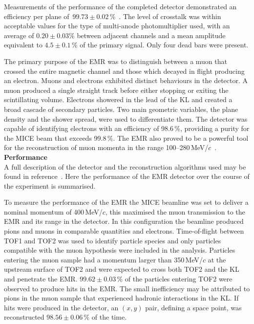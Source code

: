 Measurements of the performance of the completed detector demonstrated
an efficiency per plane
of~$99.73\pm0.02$\,\%~\cite{2016JInst..11T10007,Drielsma:2017doj}.
The level of crosstalk was within acceptable values for the type of
multi-anode photomultiplier used, with an average of $0.20\pm0.03$\%
between adjacent channels and a mean amplitude
equivalent to $4.5\pm0.1$\,\% of the primary signal.
Only four dead bars were present.

The primary purpose of the EMR was to distinguish between a muon that crossed  the entire magnetic channel and those which decayed in flight producing an electron.
Muons and electrons exhibited distinct behaviours in the detector.
A muon produced a single straight track before either stopping or
exiting the scintillating volume.
Electrons showered in the lead of the KL and created a broad cascade
of secondary particles.
Two main geometric variables, the plane density and the shower spread,
were used to differentiate them.
The detector was capable of identifying electrons with an efficiency
of 98.6\,\%, providing a purity for the MICE beam that exceeds
99.8\,\%.
The EMR also proved to be a powerful tool for the reconstruction of
muon momenta in the range
100--280\,MeV/$c$~\cite{2015JInst..10P2012A}.  \\

\noindent\textbf{Performance} \\
\noindent
A full description of the detector and the reconstruction algorithms
used may be found in reference~\cite{2015JInst..10P2012A}.
Here the performance of the EMR detector over the course of the
experiment is summarised.

To measure the performance of the EMR the MICE beamline was set to
deliver a nominal momentum of 400\,MeV/$c$, this maximised the muon
transmission to the EMR and its range in the detector.
In this configuration the beamline produced pions and muons in
comparable quantities and electrons.
Time-of-flight between TOF1 and TOF2 was used to identify particle
species and only particles compatible with the muon hypothesis were
included in the analysis.
Particles entering the muon sample had a momentum larger than
350\,MeV/$c$ at the upstream surface of TOF2 and were expected to
cross both TOF2 and the KL and penetrate the EMR.
$99.62\pm0.03\,\%$ of the particles entering TOF2 were observed to produce
hits in the EMR.
The small inefficiency may be attributed to pions in the muon sample
that experienced hadronic interactions in the KL.
If hits were produced in the detector, an $(x,y)$ pair, defining a
space point, was reconstructed $98.56\pm0.06\,\%$ of the time.

